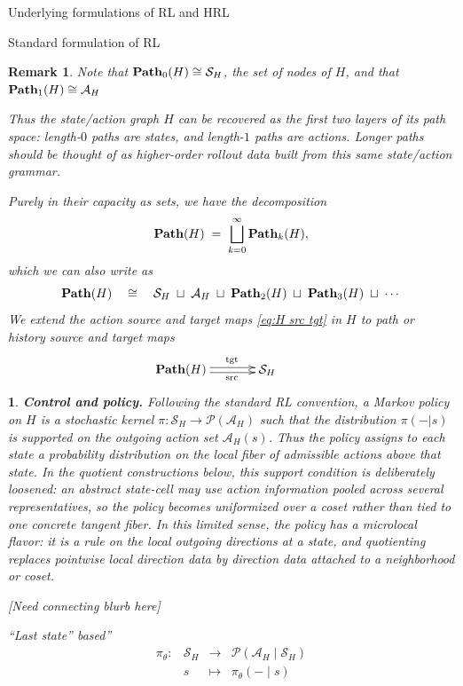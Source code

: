 \documentclass[11pt]{article}
\newtheorem{remark}[subsubsection]{Remark}
\newtheorem{ermark}[subsubsection]{}
\begin{document}
\begin{section}{Underlying formulations of RL and HRL}
\begin{subsection}{Standard formulation of RL}
\begin{remark}
Note that $\bold{Path}_{0}(H)\cong\mathcal{S}_{H}$, the set of nodes of $H$, and that $\bold{Path}_{1}(H)\cong\mathcal{A}_{H}$

Thus the state/action graph $H$ can be recovered as the first two layers of its path space: length-$0$ paths are states, and length-$1$ paths are actions. Longer paths should be thought of as higher-order rollout data built from this same state/action grammar.

Purely in their capacity as sets, we have the decomposition
$$
\bold{Path}(H)\;=\;\bigsqcup_{k=0}^{\infty}\bold{Path}_{k}(H),
$$
which we can also write as
$$
\bold{Path}(H)
\quad\cong\quad
\mathcal{S}_{H}\;\sqcup\;\mathcal{A}_{H}\;\sqcup\;\bold{Path}_{2}(H)\;\sqcup\;\bold{Path}_{3}(H)\;\sqcup\;\cdots
$$
We extend the action source and target maps \eqref{eq:H src tgt} in $H$ to {\em path} or {\em history source} and {\em target} maps
$$
\begin{xy}
(0,0)*+{\!\!\!\!\!\!\!\!\!\!\!\!\!\!\!\bold{Path}(H)}="1";
(20,0)*+{\mathcal{S}_{H}}="2";
{\ar@<2pt>^{\text{tgt}} "1"; "2"}
{\ar@<-2pt>_{\text{src}} "1"; "2"}
\end{xy}
$$
\end{remark}

\begin{ermark}
{\bf Control and policy.}
\normalfont
Following the standard RL convention, a Markov policy on $H$ is a stochastic kernel
$
\pi:\mathcal{S}_{H}\longrightarrow\mathcal{P}(\mathcal{A}_{H})
$
such that the distribution $\pi(-|s)$ is supported on the outgoing action set $\mathcal{A}_{H}(s)$. Thus the policy assigns to each state a probability distribution on the local fiber of admissible actions above that state. In the quotient constructions below, this support condition is deliberately loosened: an abstract state-cell may use action information pooled across several representatives, so the policy becomes uniformized over a coset rather than tied to one concrete tangent fiber. In this limited sense, the policy has a microlocal flavor: it is a rule on the local outgoing directions at a state, and quotienting replaces pointwise local direction data by direction data attached to a neighborhood or coset.

{\color{blue} [Need connecting blurb here]}

``Last state'' based''
$$
\begin{array}{rrcl}
\pi_{\theta}:
&\mathcal{S}_{H}
&
\!\!\!\!\longrightarrow\!\!\!\!
&\mathcal{P}(\mathcal{A}_{H}\mid\mathcal{S}_{H}) \\[5pt]
&
s
&
\!\!\!\!\longmapsto\!\!\!\!
& \pi_{\theta}(-\mid s)
\end{array}
$$



\end{ermark}
\end{subsection}
\end{section}
\end{document}
